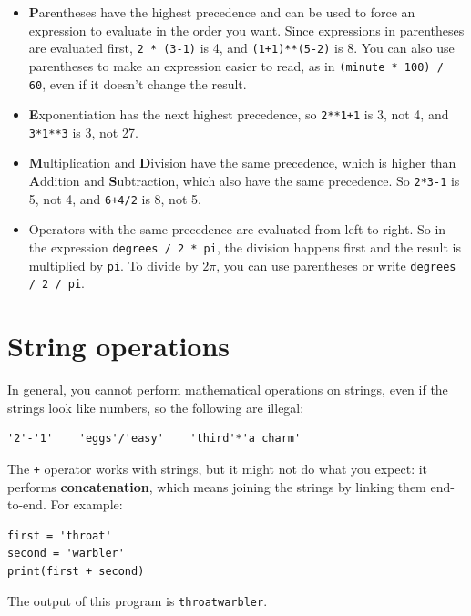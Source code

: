 \documentclass[10pt]{book}
\begin{document}
\begin{itemize}

\item {\bf P}arentheses have the highest precedence and can be used 
to force an expression to evaluate in the order you want. Since
expressions in parentheses are evaluated first, {\tt 2 * (3-1)} is 4,
and {\tt (1+1)**(5-2)} is 8. You can also use parentheses to make an
expression easier to read, as in {\tt (minute * 100) / 60}, even
if it doesn't change the result.

\item {\bf E}xponentiation has the next highest precedence, so
{\tt 2**1+1} is 3, not 4, and {\tt 3*1**3} is 3, not 27.

\item {\bf M}ultiplication and {\bf D}ivision have the same precedence,
which is higher than {\bf A}ddition and {\bf S}ubtraction, which also
have the same precedence.  So {\tt 2*3-1} is 5, not 4, and
{\tt 6+4/2} is 8, not 5.

\item Operators with the same precedence are evaluated from left to 
right.  So in the expression {\tt degrees / 2 * pi}, the division
happens first and the result is multiplied by {\tt pi}.  
To divide by $2 \pi$, you can use parentheses or write {\tt degrees / 2 / pi}.

\end{itemize}


\section{String operations}

In general, you cannot perform mathematical operations on strings, even
if the strings look like numbers, so the following are illegal:

\beforeverb
\begin{verbatim}
'2'-'1'    'eggs'/'easy'    'third'*'a charm'
\end{verbatim}
\afterverb
%
The {\tt +} operator works with strings, but it
might not do what you expect: it performs
{\bf concatenation}, which means joining the strings by
linking them end-to-end.  For example:


\beforeverb
\begin{verbatim}
first = 'throat'
second = 'warbler'
print(first + second)
\end{verbatim}
\afterverb
%
The output of this program is {\tt throatwarbler}.
\end{document}
